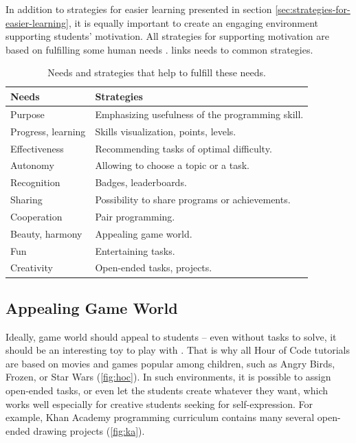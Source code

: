 In addition to strategies for easier learning presented in section
\ref{sec:strategies-for-easier-learning}, it is equally important to create an
engaging environment supporting students’ motivation.
All strategies for supporting motivation are based on fulfilling some human
needs \cite{nvc}. %
 links needs to common strategies.

\begin{table}[htb]
\centering
\begin{tabular}{ll}
\toprule
Needs & Strategies \\
\midrule
Purpose & Emphasizing usefulness of the programming skill. \\ %
Progress, learning & Skills visualization, points, levels. \\
Effectiveness & Recommending tasks of optimal difficulty. \\ %
Autonomy & Allowing to choose a topic or a task. \\
Recognition & Badges, leaderboards. \\  %
Sharing & Possibility to share programs or achievements. \\
Cooperation & Pair programming. \\
Beauty, harmony & Appealing game world. \\ %
Fun & Entertaining tasks. \\
Creativity & Open-ended tasks, projects. \\  %
\bottomrule
\end{tabular}
\caption{Needs and strategies that help to fulfill these needs.}
\label{tbl:motivation-strategies}
\end{table}



\subsection{Appealing Game World}
\label{sec:motivation.game-world}
Ideally, game world should appeal to students --
even without tasks to solve,
  it should be an interesting toy to play with \cite{book-of-lenses}.
That is why all Hour of Code tutorials are based on movies and games
  popular among children, such as Angry Birds, Frozen, or Star Wars
  (\cref{fig:hoc}).
In such environments, it is possible to assign open-ended tasks,
  or even let the students create whatever they want,
  which works well especially for creative students seeking for self-expression.
For example, Khan Academy programming curriculum contains many several
open-ended drawing projects (\cref{fig:ka}).

